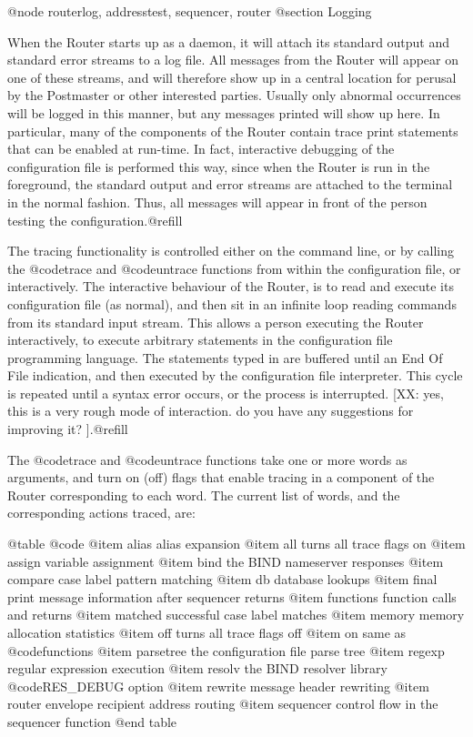 {{@node routerlog, addresstest, sequencer, router
@section Logging

When the Router starts up as a daemon, it will attach its standard output and
standard error streams to a log file.  All messages from the Router will
appear on one of these streams, and will therefore show up in a central
location for perusal by the Postmaster or other interested parties.  Usually
only abnormal occurrences will be logged in this manner, but any messages
printed will show up here.  In particular, many of the components of the
Router contain trace print statements that can be enabled at run-time.  In
fact, interactive debugging of the configuration file is performed this way,
since when the Router is run in the foreground, the standard output and
error streams are attached to the terminal in the normal fashion.  Thus,
all messages will appear in front of the person testing the
configuration.@refill

The tracing functionality is controlled either on the command line, or by
calling the @code{trace} and @code{untrace} functions from within the
configuration file, or interactively.  The interactive behaviour of the
Router, is to read and execute its configuration file (as normal), and
then sit in an infinite loop reading commands from its standard input stream.
This allows a person executing the Router interactively, to execute arbitrary
statements in the configuration file programming language.  The statements
typed in are buffered until an End Of File indication, and then executed by the
configuration file interpreter.  This cycle is repeated until a syntax error
occurs, or the process is interrupted.  [XX: yes, this is a very rough mode of
interaction. do you have any suggestions for improving it? ].@refill

The @code{trace} and @code{untrace} functions take one or more words as
arguments, and turn on (off) flags that enable tracing in a component of
the Router corresponding to each word.  The current list of words, and the
corresponding actions traced, are:

@table @code
@item alias
alias expansion
@item all
turns all trace flags on
@item assign
variable assignment
@item bind
the BIND nameserver responses
@item compare
case label pattern matching
@item db
database lookups
@item final
print message information after sequencer returns
@item functions
function calls and returns
@item matched
successful case label matches
@item memory
memory allocation statistics
@item off
turns all trace flags off
@item on
same as @code{functions}
@item parsetree
the configuration file parse tree
@item regexp
regular expression execution
@item resolv
the BIND resolver library @code{RES_DEBUG} option
@item rewrite
message header rewriting
@item router
envelope recipient address routing
@item sequencer
control flow in the sequencer function
@end table

}}
